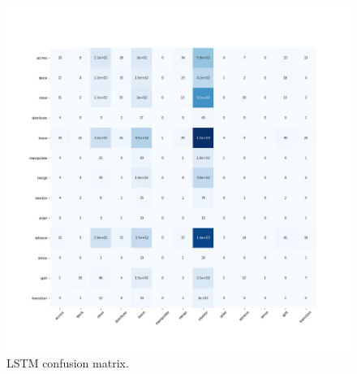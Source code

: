 \documentclass[12pt, a4paper]{report}
\begin{document}
		\begin{figure}[h!]
			\centering
			\includegraphics[width=1.\textwidth]{cfs_mtrx/epic55LSTM1_50.tf.npz_0.png}
			\caption{LSTM confusion matrix.}
			\label{cfs_mtrx_lstm}
		\end{figure}
	\makeutbmbackcover{}
\end{document}
